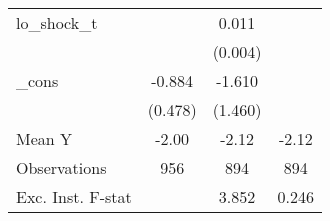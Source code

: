 {\begin{tabular}{l*{3}{c}}
\addlinespace
lo\_shock\_t  &                     &       0.011\sym{***}&                     \\
            &                     &     (0.004)         &                     \\
\addlinespace
\_cons      &      -0.884\sym{*}  &      -1.610         &                     \\
            &     (0.478)         &     (1.460)         &                     \\
\midrule
Mean Y      &       -2.00         &       -2.12         &       -2.12         \\
Observations&         956         &         894         &         894         \\
Exc. Inst. F-stat&                     &       3.852         &       0.246         \\
\bottomrule
\end{tabular}
}
